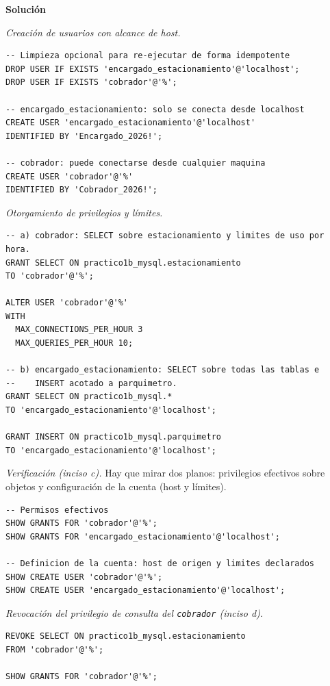 \documentclass[11pt,a4paper]{article}
\newcommand{\itemcabecera}[1]{\noindent\textbf{#1}\par\medskip}
\newcommand{\bloqueSolucion}{\itemcabecera{Soluci\'on}}
\begin{document}
\bloqueSolucion

\textit{Creación de usuarios con alcance de host.}

\begin{lstlisting}
-- Limpieza opcional para re-ejecutar de forma idempotente
DROP USER IF EXISTS 'encargado_estacionamiento'@'localhost';
DROP USER IF EXISTS 'cobrador'@'%';

-- encargado_estacionamiento: solo se conecta desde localhost
CREATE USER 'encargado_estacionamiento'@'localhost'
IDENTIFIED BY 'Encargado_2026!';

-- cobrador: puede conectarse desde cualquier maquina
CREATE USER 'cobrador'@'%'
IDENTIFIED BY 'Cobrador_2026!';
\end{lstlisting}

\textit{Otorgamiento de privilegios y límites.}

\begin{lstlisting}
-- a) cobrador: SELECT sobre estacionamiento y limites de uso por hora.
GRANT SELECT ON practico1b_mysql.estacionamiento
TO 'cobrador'@'%';

ALTER USER 'cobrador'@'%'
WITH
  MAX_CONNECTIONS_PER_HOUR 3
  MAX_QUERIES_PER_HOUR 10;

-- b) encargado_estacionamiento: SELECT sobre todas las tablas e
--    INSERT acotado a parquimetro.
GRANT SELECT ON practico1b_mysql.*
TO 'encargado_estacionamiento'@'localhost';

GRANT INSERT ON practico1b_mysql.parquimetro
TO 'encargado_estacionamiento'@'localhost';
\end{lstlisting}

\textit{Verificación (inciso c).} Hay que mirar dos planos: privilegios efectivos sobre objetos y configuración de la cuenta (host y límites).

\begin{lstlisting}
-- Permisos efectivos
SHOW GRANTS FOR 'cobrador'@'%';
SHOW GRANTS FOR 'encargado_estacionamiento'@'localhost';

-- Definicion de la cuenta: host de origen y limites declarados
SHOW CREATE USER 'cobrador'@'%';
SHOW CREATE USER 'encargado_estacionamiento'@'localhost';
\end{lstlisting}

\textit{Revocación del privilegio de consulta del \texttt{cobrador} (inciso d).}

\begin{lstlisting}
REVOKE SELECT ON practico1b_mysql.estacionamiento
FROM 'cobrador'@'%';

SHOW GRANTS FOR 'cobrador'@'%';
\end{lstlisting}
\end{document}
